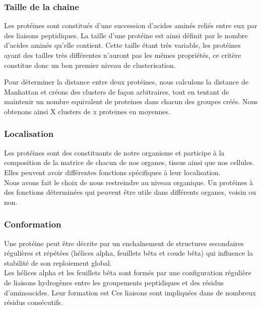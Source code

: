 \subsubsection*{Taille de la chaîne}
Les protéines sont constitués d'une succession d'acides aminés reliés entre eux par des liaisons peptidiques. La taille d'une protéine est ainsi définit par le nombre d'acides aminés qu'elle contient. Cette taille étant très variable, les protéines ayant des tailles très différentes n'auront pas les mêmes propriétés, ce critère constitue donc un bon premier niveau de clusterisation.

Pour déterminer la distance entre deux protéines, nous calculons la distance de Manhattan et créons des clusters de façon arbitraires, tout en tentant de maintenir un nombre equivalent de proteines dans chacun des groupes créés. Nous obtenons ainsi X clusters de x proteines en moyennes.\\

\subsubsection*{Localisation}
Les protéines sont des constituants de notre organisme et participe à la composition de la matrice de chacun de nos organes, tissus ainsi que nos cellules. Elles peuvent avoir différentes fonctions spécifiques à leur localisation.\\
Nous avons fait le choix de nous restreindre au niveau organique. Un protéines à des fonctions déterminées qui peuvent être utile dans différents organes, voisin ou non. 
\\

\subsubsection*{Conformation}
Une protéine peut être décrite par un enchaînement de structures secondaires régulières et répétées (hélices alpha, feuillets bêta et coude bêta) qui influence la stabilité de son reploiement global.\\
Les hélices alpha et les feuillets bêta sont formés par une configuration régulière de liaisons hydrogènes entre les groupements peptidiques  et  des résidus d'aminoacides. Leur formation est Ces liaisons sont impliquées dans de nombreux résidus consécutifs.
\\


